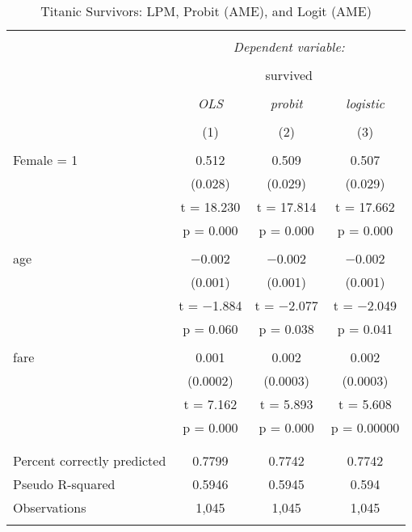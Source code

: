 \documentclass[
  12pt,
]{article}
\begin{document}
\begin{table}[t] \centering 
  \caption{Titanic Survivors: LPM, Probit (AME), and Logit (AME)} 
  \label{titanic} 
\begin{tabular}{@{\extracolsep{5pt}}lccc} 
\\[-1.8ex]\hline 
\hline \\[-1.8ex] 
 & \multicolumn{3}{c}{\textit{Dependent variable:}} \\ 
\cline{2-4} 
\\[-1.8ex] & \multicolumn{3}{c}{survived} \\ 
\\[-1.8ex] & \textit{OLS} & \textit{probit} & \textit{logistic} \\ 
\\[-1.8ex] & (1) & (2) & (3)\\ 
\hline \\[-1.8ex] 
 Female = 1 & 0.512 & 0.509 & 0.507 \\ 
  & (0.028) & (0.029) & (0.029) \\ 
  & t = 18.230 & t = 17.814 & t = 17.662 \\ 
  & p = 0.000 & p = 0.000 & p = 0.000 \\ 
  & & & \\ 
 age & $-$0.002 & $-$0.002 & $-$0.002 \\ 
  & (0.001) & (0.001) & (0.001) \\ 
  & t = $-$1.884 & t = $-$2.077 & t = $-$2.049 \\ 
  & p = 0.060 & p = 0.038 & p = 0.041 \\ 
  & & & \\ 
 fare & 0.001 & 0.002 & 0.002 \\ 
  & (0.0002) & (0.0003) & (0.0003) \\ 
  & t = 7.162 & t = 5.893 & t = 5.608 \\ 
  & p = 0.000 & p = 0.000 & p = 0.00000 \\ 
  & & & \\ 
\hline \\[-1.8ex] 
Percent correctly predicted & 0.7799 & 0.7742 & 0.7742 \\ 
Pseudo R-squared & 0.5946 & 0.5945 & 0.594 \\ 
Observations & 1,045 & 1,045 & 1,045 \\ 
\hline 
\hline \\[-1.8ex] 
\end{tabular} 
\end{table}
\end{document}
